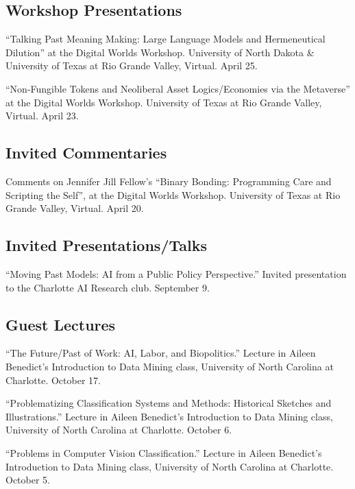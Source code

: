 \documentclass{article}
\begin{document}
\subsection*{\normalsize{Workshop Presentations}}
\begin{tablist}
    \item[2025] \tab{}\enquote{Talking Past Meaning Making: Large Language Models and Hermeneutical Dilution} at the Digital Worlds Workshop. University of North Dakota \& University of Texas at Rio Grande Valley, Virtual. April 25.
    \item[2023] \tab{}\enquote{Non-Fungible Tokens and Neoliberal Asset Logics/Economies via the Metaverse} at the Digital Worlds Workshop. University of Texas at Rio Grande Valley, Virtual. April 23.
\end{tablist}

\subsection*{\normalsize{Invited Commentaries}}
\begin{tablist}
    \item[2024] \tab{}Comments on Jennifer Jill Fellow's \enquote{Binary Bonding: Programming Care and Scripting the Self}, at the Digital Worlds Workshop. University of Texas at Rio Grande Valley, Virtual. April 20.
\end{tablist}

\subsection*{\normalsize{Invited Presentations/Talks}}
\begin{tablist}
    \item[2024] \tab{}\enquote{Moving Past Models: AI from a Public Policy Perspective.} Invited presentation to the Charlotte AI Research club. September 9.
\end{tablist}

\subsection*{\normalsize{Guest Lectures}}
\begin{tablist}
    \item[2024] \tab{}\enquote{The Future/Past of Work: AI, Labor, and Biopolitics.} Lecture in Aileen Benedict's Introduction to Data Mining class, University of North Carolina at Charlotte. October 17.
    \item[2023] \tab{}\enquote{Problematizing Classification Systems and Methods: Historical Sketches and Illustrations.} Lecture in Aileen Benedict's Introduction to Data Mining class, University of North Carolina at Charlotte. October 6.
    \item[2022] \tab{}\enquote{Problems in Computer Vision Classification.} Lecture in Aileen Benedict's Introduction to Data Mining class, University of North Carolina at Charlotte. October 5.
\end{tablist}
\end{document}
